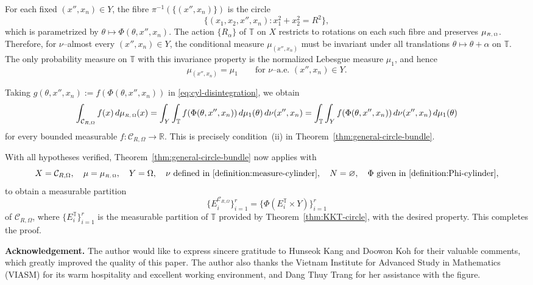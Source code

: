 \documentclass[11pt]{article}
\numberwithin{equation}{section}
\theoremstyle{remark}
\begin{document}
For each fixed $(x'', x_n) \in Y$, the fibre $\pi^{-1}(\{(x'', x_n)\})$ is the circle
\[
\{(x_1,x_2, x'', x_n) : x_1^2+x_2^2=R^2\},
\]
which is parametrized by $\theta\mapsto\Phi(\theta, x'', x_n)$. The action $\{R_\alpha\}$ of $\mathbb{T}$ on $X$ restricts to rotations on each such fibre and preserves $\mu_{\text{\tiny $R,\Omega$}}$. Therefore, for $\nu$–almost every $(x'', x_n)\in Y$, the conditional measure $\mu_{(x'', x_n)}$ must be invariant under all translations $\theta\mapsto\theta+\alpha$ on $\mathbb{T}$. The only probability measure on $\mathbb{T}$ with this invariance property is the normalized Lebesgue measure $\mu_1$, and hence
\[
\mu_{(x'', x_n)} = \mu_1\qquad\text{for $\nu$–a.e. } (x'', x_n)\in Y.
\]

Taking $g(\theta, x'', x_n):=f(\Phi(\theta, x'', x_n))$ in
\eqref{eq:cyl-disintegration}, we obtain
\[
\int_{\mathcal{C}_{R,\Omega}} f(x)\,d\mu_{\text{\tiny $R,\Omega$}}(x)
= \int_Y\int_\mathbb{T} f(\Phi(\theta, x'', x_n))\,d\mu_1(\theta)\,d\nu(x'', x_n)
= \int_\mathbb{T} \int_Y f(\Phi(\theta, x'', x_n))\,d\nu(x'', x_n)\,d\mu_1(\theta)
\]
for every bounded measurable $f:\mathcal{C}_{R,\Omega}\to\mathbb{R}$.
This is precisely condition~(ii) in Theorem~\ref{thm:general-circle-bundle}.


With all hypotheses verified, Theorem~\ref{thm:general-circle-bundle} now applies with
\[
X=\mathcal{C}_{R,\Omega},\quad \mu=\mu_{\text{\tiny $R,\Omega$}},\quad
Y=\Omega,\quad
\nu \text{ defined in \eqref{definition:measure-cylinder}},\quad
N= \varnothing,\quad
\Phi \text{ given in \eqref{definition:Phi-cylinder}},
\]
to obtain a measurable partition
\[
\{E_i^{\mathcal{C}_{R,\Omega}}\}_{i=1}^r
   =\{\Phi(E_i^\mathbb{T} \times Y)\}_{i=1}^r
\]
of $\mathcal{C}_{R,\Omega}$, where $\{E_i^\mathbb{T}\}_{i=1}^r$ is the measurable partition of $\mathbb{T}$ provided by Theorem~\ref{thm:KKT-circle}, with the desired property. 
This completes the proof.




{\bf Acknowledgement.} 
The author would like to express sincere gratitude to Hunseok Kang and Doowon Koh for their valuable comments, which greatly improved the quality of this paper. The author also thanks the Vietnam Institute for Advanced Study in Mathematics (VIASM) for its warm hospitality and excellent working environment, and Dang Thuy Trang for her assistance with the figure.
\end{document}
